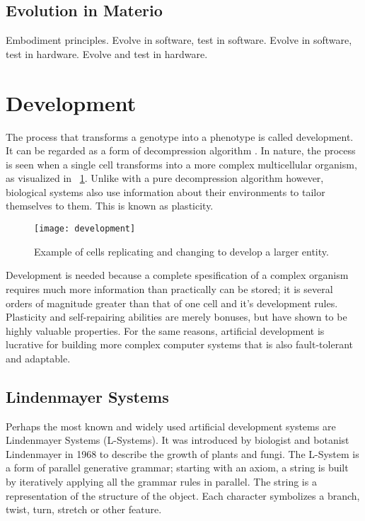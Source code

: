 \subsection{Evolution in Materio}

\TODO
Embodiment principles.
Evolve in software, test in software.
Evolve in software, test in hardware.
Evolve and test in hardware.


\section{Development}

The process that transforms a genotype into a phenotype is called development.
It can be regarded as a form of decompression algorithm \cite{harding2008artificial}.
In nature, the process is seen when a single cell transforms into a more complex multicellular organism, as visualized in \figurename~\ref{fig:development}.
Unlike with a pure decompression algorithm however, biological systems also use information about their environments to tailor themselves to them.
This is known as plasticity.

\begin{figure}[!ht]
    \centering
    \texttt{[image: development]}
    \caption[Development]{
        Example of cells replicating and changing to develop a larger entity.
    }
    \label{fig:development}
\end{figure}

Development is needed because a complete spesification of a complex organism requires much more information than practically can be stored; it is several orders of magnitude greater than that of one cell and it's development rules.
Plasticity and self-repairing abilities are merely bonuses, but have shown to be highly valuable properties.
For the same reasons, artificial development is lucrative for building more complex computer systems that is also fault-tolerant and adaptable.

\subsection{Lindenmayer Systems}

Perhaps the most known and widely used artificial development systems are Lindenmayer Systems (L-Systems).
It was introduced by biologist and botanist Lindenmayer in 1968 to describe the growth of plants and fungi\cite{lindenmayer1968models}.
The L-System is a form of parallel generative grammar; starting with an axiom, a string is built by iteratively applying all the grammar rules in parallel.
The string is a representation of the structure of the object.
Each character symbolizes a branch, twist, turn, stretch or other feature.


